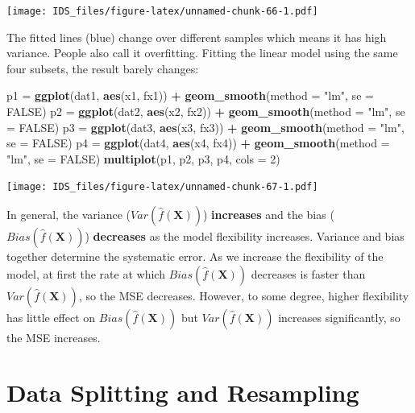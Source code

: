 \documentclass[12pt,]{krantz}
\makeatletter
\newenvironment{Shaded}{\begin{snugshade}}{\end{snugshade}}
\newcommand{\DataTypeTok}[1]{\textcolor[rgb]{0.27,0.27,0.27}{#1}}
\newcommand{\DecValTok}[1]{\textcolor[rgb]{0.06,0.06,0.06}{#1}}
\newcommand{\KeywordTok}[1]{\textcolor[rgb]{0.27,0.27,0.27}{\textbf{#1}}}
\newcommand{\NormalTok}[1]{#1}
\newcommand{\OperatorTok}[1]{\textcolor[rgb]{0.43,0.43,0.43}{\textbf{#1}}}
\newcommand{\OtherTok}[1]{\textcolor[rgb]{0.37,0.37,0.37}{#1}}
\newcommand{\StringTok}[1]{\textcolor[rgb]{0.5,0.5,0.5}{#1}}
\newenvironment{kframe}{%
\medskip{}
\setlength{\fboxsep}{.8em}
 \def\at@end@of@kframe{}%
 \ifinner\ifhmode%
  \def\at@end@of@kframe{\end{minipage}}%
  \begin{minipage}{\columnwidth}%
 \fi\fi%
 \def\FrameCommand##1{\hskip\@totalleftmargin \hskip-\fboxsep
 \colorbox{shadecolor}{##1}\hskip-\fboxsep
     \hskip-\linewidth \hskip-\@totalleftmargin \hskip\columnwidth}%
 \MakeFramed {\advance\hsize-\width
   \@totalleftmargin\z@ \linewidth\hsize
   \@setminipage}}%
 {\par\unskip\endMakeFramed%
 \at@end@of@kframe}
\renewenvironment{Shaded}{\begin{kframe}}{\end{kframe}}
\makeatother
\begin{document}
\texttt{[image: IDS\_files/figure-latex/unnamed-chunk-66-1.pdf]}

The fitted lines (blue) change over different samples which means it has high variance. People also call it overfitting. Fitting the linear model using the same four subsets, the result barely changes:

\begin{Shaded}
\begin{Highlighting}[]
\NormalTok{p1 =}\StringTok{ }\KeywordTok{ggplot}\NormalTok{(dat1, }\KeywordTok{aes}\NormalTok{(x1, fx1)) }\OperatorTok{+}\StringTok{ }\KeywordTok{geom_smooth}\NormalTok{(}\DataTypeTok{method =} \StringTok{"lm"}\NormalTok{, }
    \DataTypeTok{se =} \OtherTok{FALSE}\NormalTok{)}
\NormalTok{p2 =}\StringTok{ }\KeywordTok{ggplot}\NormalTok{(dat2, }\KeywordTok{aes}\NormalTok{(x2, fx2)) }\OperatorTok{+}\StringTok{ }\KeywordTok{geom_smooth}\NormalTok{(}\DataTypeTok{method =} \StringTok{"lm"}\NormalTok{, }
    \DataTypeTok{se =} \OtherTok{FALSE}\NormalTok{)}
\NormalTok{p3 =}\StringTok{ }\KeywordTok{ggplot}\NormalTok{(dat3, }\KeywordTok{aes}\NormalTok{(x3, fx3)) }\OperatorTok{+}\StringTok{ }\KeywordTok{geom_smooth}\NormalTok{(}\DataTypeTok{method =} \StringTok{"lm"}\NormalTok{, }
    \DataTypeTok{se =} \OtherTok{FALSE}\NormalTok{)}
\NormalTok{p4 =}\StringTok{ }\KeywordTok{ggplot}\NormalTok{(dat4, }\KeywordTok{aes}\NormalTok{(x4, fx4)) }\OperatorTok{+}\StringTok{ }\KeywordTok{geom_smooth}\NormalTok{(}\DataTypeTok{method =} \StringTok{"lm"}\NormalTok{, }
    \DataTypeTok{se =} \OtherTok{FALSE}\NormalTok{)}
\KeywordTok{multiplot}\NormalTok{(p1, p2, p3, p4, }\DataTypeTok{cols =} \DecValTok{2}\NormalTok{)}
\end{Highlighting}
\end{Shaded}

\texttt{[image: IDS\_files/figure-latex/unnamed-chunk-67-1.pdf]}

In general, the variance (\(Var(\hat{f}(\mathbf{X}))\)) \textbf{increases} and the bias (\(Bias(\hat{f}(\mathbf{X}))\)) \textbf{decreases} as the model flexibility increases. Variance and bias together determine the systematic error. As we increase the flexibility of the model, at first the rate at which \(Bias(\hat{f}(\mathbf{X}))\) decreases is faster than \(Var (\hat{f} (\mathbf{X}))\), so the MSE decreases. However, to some degree, higher flexibility has little effect on \(Bias(\hat{f}(\mathbf{X}))\) but \(Var(\hat{f} (\mathbf{X}))\) increases significantly, so the MSE increases.

\hypertarget{datasplittingresampling}{%
\section{Data Splitting and Resampling}\label{datasplittingresampling}}
\end{document}
